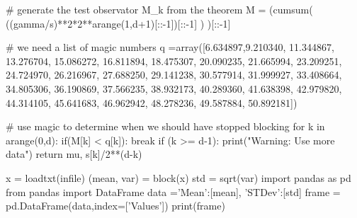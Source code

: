 \documentclass[%
oneside,                 %
final,                   %
10pt]{article}
\begin{document}
    # generate the test observator M_k from the theorem
    M = (cumsum( ((gamma/s)**2*2**arange(1,d+1)[::-1])[::-1] )  )[::-1]

    # we need a list of magic numbers
    q =array([6.634897,9.210340, 11.344867, 13.276704, 15.086272, 16.811894, 18.475307, 20.090235, 21.665994, 23.209251, 24.724970, 26.216967, 27.688250, 29.141238, 30.577914, 31.999927, 33.408664, 34.805306, 36.190869, 37.566235, 38.932173, 40.289360, 41.638398, 42.979820, 44.314105, 45.641683, 46.962942, 48.278236, 49.587884, 50.892181])

    # use magic to determine when we should have stopped blocking
    for k in arange(0,d):
        if(M[k] < q[k]):
            break
    if (k >= d-1):
        print("Warning: Use more data")
    return mu, s[k]/2**(d-k)


x = loadtxt(infile)
(mean, var) = block(x) 
std = sqrt(var)
import pandas as pd
from pandas import DataFrame
data ={'Mean':[mean], 'STDev':[std]}
frame = pd.DataFrame(data,index=['Values'])
print(frame)


\epycod




\end{document}
